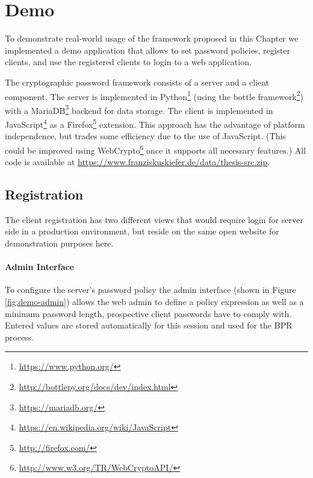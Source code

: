 \section{Demo} \label{sec:vpake-demo}

To demonstrate real-world usage of the framework proposed in this Chapter we implemented a demo application that allows to set password policies, register clients, and use the registered clients to login to a web application.

The cryptographic password framework consists of a server and a client component.
The server is implemented in Python\footnote{\url{https://www.python.org/}} (using the bottle framework\footnote{\url{http://bottlepy.org/docs/dev/index.html}}) with a MariaDB\footnote{\url{https://mariadb.org/}} backend for data storage.
The client is implemented in JavaScript\footnote{\url{https://en.wikipedia.org/wiki/JavaScript}} as a Firefox\footnote{\url{http://firefox.com/}} extension.
This approach has the advantage of platform independence, but trades some efficiency due to the use of JavaScript.
(This could be improved using WebCrypto\footnote{\url{http://www.w3.org/TR/WebCryptoAPI/}} once it supports all necessary features.)
All code is available at \url{https://www.franziskuskiefer.de/data/thesis-src.zip}.

\subsection{Registration}
The client registration has two different views that would require login for server side in a production environment, but reside on the same open website for demonstration purposes here.

\paragraph{Admin Interface}
To configure the server's password policy the admin interface (shown in Figure \ref{fig:demo-admin}) allows the web admin to define a policy expression as well as a minimum password length, prospective client passwords have to comply with.
Entered values are stored automatically for this session and used for the \ac{BPR} process.

